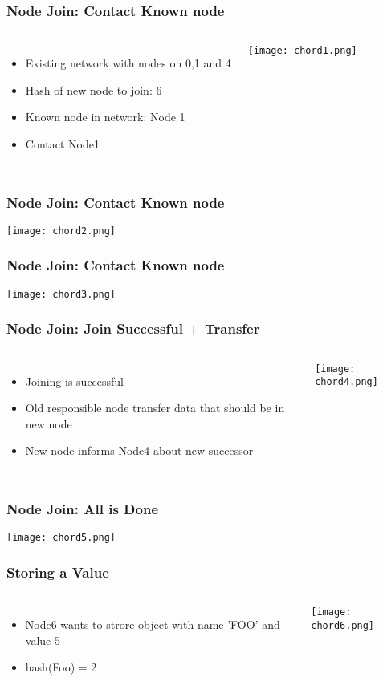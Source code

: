\begin{frame}
    \frametitle{Node Join: Contact Known node}
    \begin{columns}
        \begin{itemize}
            \item Existing network with nodes on 0,1 and 4
            \item Hash of new node to join: 6
            \item Known node in network: Node 1
            \item Contact Node1
        \end{itemize}
            \texttt{[image: chord1.png]}
    \end{columns}
\end{frame}

\begin{frame}
    \frametitle{Node Join: Contact Known node}
    \texttt{[image: chord2.png]}
\end{frame}

\begin{frame}
    \frametitle{Node Join: Contact Known node}
    \texttt{[image: chord3.png]}
\end{frame}

\begin{frame}
    \frametitle{Node Join: Join Successful + Transfer}
    \begin{columns}
        \begin{itemize}
            \item Joining is successful
            \item Old responsible node transfer data that should be in new node
            \item New node informs Node4 about new successor
        \end{itemize}
            \texttt{[image: chord4.png]}
    \end{columns}
\end{frame}

\begin{frame}
    \frametitle{Node Join: All is Done}
    \texttt{[image: chord5.png]}
\end{frame}

\begin{frame}
    \frametitle{Storing a Value}
    \begin{columns}
        \begin{itemize}
            \item Node6 wants to strore object with name 'FOO' and value 5
            \item hash(Foo) = 2
        \end{itemize}
            \texttt{[image: chord6.png]}
    \end{columns}
\end{frame}

